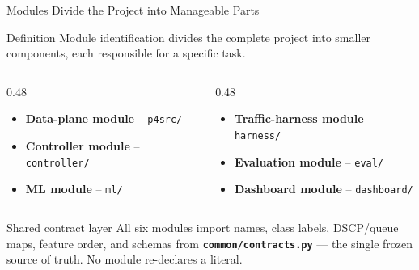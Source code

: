 \documentclass[aspectratio=169,11pt]{beamer}
\begin{document}
\begin{frame}{Modules Divide the Project into Manageable Parts}
  \begin{block}{Definition}
    Module identification divides the complete project into smaller components, each responsible
    for a specific task.
  \end{block}
  \begin{columns}[T, onlytextwidth]
    \begin{column}{0.48\textwidth}
      \begin{itemize}
        \item \textbf{Data-plane module} -- \texttt{p4src/}
        \item \textbf{Controller module} -- \texttt{controller/}
        \item \textbf{ML module} -- \texttt{ml/}
      \end{itemize}
    \end{column}
    \begin{column}{0.48\textwidth}
      \begin{itemize}
        \item \textbf{Traffic-harness module} -- \texttt{harness/}
        \item \textbf{Evaluation module} -- \texttt{eval/}
        \item \textbf{Dashboard module} -- \texttt{dashboard/}
      \end{itemize}
    \end{column}
  \end{columns}
  \vspace{0.4em}
  \begin{alertblock}{Shared contract layer}
    All six modules import names, class labels, DSCP/queue maps, feature order, and schemas from
    \textbf{\texttt{common/contracts.py}} --- the single frozen source of truth. No module
    re-declares a literal.
  \end{alertblock}
\end{frame}
\end{document}
